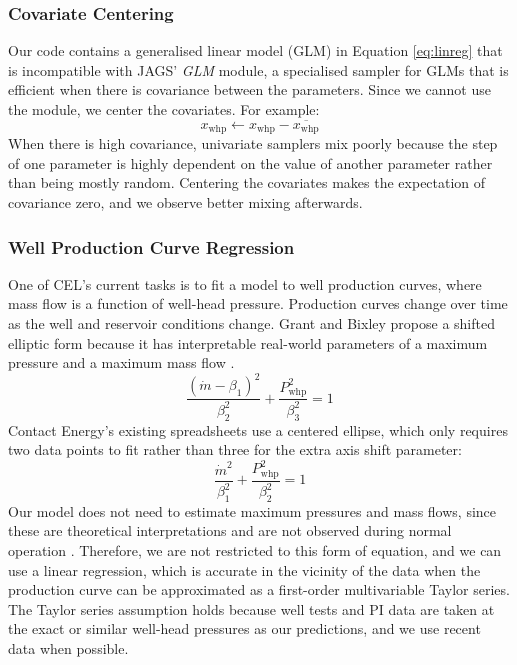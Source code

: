 \documentclass[a4paper, 12pt]{article}
\begin{document}
\subsubsection{Covariate Centering}
Our code contains a generalised linear model (GLM) in Equation \ref{eq:linreg} that is incompatible with JAGS' \emph{GLM} module, a specialised sampler for GLMs that is efficient when there is covariance between the parameters. Since we cannot use the module, we center the covariates. For example:
\begin{equation}
x_\text{whp} \leftarrow x_\text{whp} - \overline{x_\text{whp}}
\end{equation}
When there is high covariance, univariate samplers mix poorly because the step of one parameter is highly dependent on the value of another parameter rather than being mostly random. Centering the covariates makes the expectation of covariance zero, and we observe better mixing afterwards.

\subsubsection{Well Production Curve Regression}
One of CEL's current tasks is to fit a model to well production curves, where mass flow is a function of well-head pressure. Production curves change over time as the well and reservoir conditions change. Grant and Bixley propose a shifted elliptic form because it has interpretable real-world parameters of a maximum pressure and a maximum mass flow \cite{Grant:2011}.
\begin{equation}
\frac{\left( \dot{m}-\beta_1 \right)^2}{\beta_2^2} + \frac{P_\text{whp}^2}{\beta_3^2} = 1
\end{equation}
Contact Energy's existing spreadsheets use a centered ellipse, which only requires two data points to fit rather than three for the extra axis shift parameter:
\begin{equation}
\frac{\dot{m}^2}{\beta_1^2} + \frac{P_\text{whp}^2}{\beta_2^2} = 1
\end{equation}
Our model does not need to estimate maximum pressures and mass flows, since these are theoretical interpretations and are not observed during normal operation \cite{Marsh:2015}. Therefore, we are not restricted to this form of equation, and we can use a linear regression, which is accurate in the vicinity of the data when the production curve can be approximated as a first-order multivariable Taylor series. The Taylor series assumption holds because well tests and PI data are taken at the exact or similar well-head pressures as our predictions, and we use recent data when possible.
\end{document}
